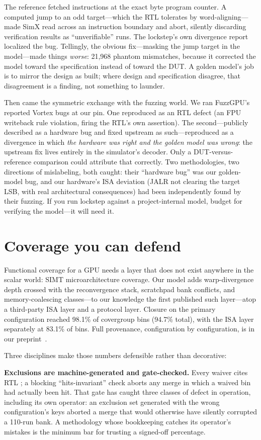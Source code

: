 \documentclass[conference]{IEEEtran}
\newcommand{\code}[1]{\texttt{\detokenize{#1}}}
\begin{document}
The reference fetched instructions at the exact byte program counter.
A computed jump to an odd target---which the RTL tolerates by
word-aligning---made SimX read across an instruction boundary and
abort, silently discarding verification results as ``unverifiable''
runs. The lockstep's own divergence report localized the bug.
Tellingly, the obvious fix---masking the jump target in the
model---made things \emph{worse}: 21{,}968 phantom mismatches,
because it corrected the model toward the specification instead of
toward the DUT. A golden model's job is to mirror the design as
built; where design and specification disagree, that disagreement is
a finding, not something to launder.

Then came the symmetric exchange with the fuzzing world. We ran
FuzzGPU's reported Vortex bugs at our pin. One reproduced as an RTL
defect (an FPU writeback rule violation, firing the RTL's own
assertion). The second---publicly described as a hardware bug and
fixed upstream as such---reproduced as a divergence in which
\emph{the hardware was right and the golden model was wrong}: the
upstream fix lives entirely in the simulator's decoder. Only a
DUT-versus-reference comparison could attribute that correctly. Two
methodologies, two directions of mislabeling, both caught: their
``hardware bug'' was our golden-model bug, and our hardware's ISA
deviation (JALR not clearing the target LSB, with real architectural
consequences) had been independently found by their fuzzing. If you
run lockstep against a project-internal model, budget for verifying
the model---it will need it.

\section{Coverage you can defend}
Functional coverage for a GPU needs a layer that does not exist
anywhere in the scalar world: SIMT microarchitecture coverage. Our
model adds warp-divergence depth crossed with the reconvergence
stack, scratchpad bank conflicts, and memory-coalescing
classes---to our knowledge the first published such layer---atop a
third-party ISA layer and a protocol layer. Closure on the primary
configuration reached 98.1\% of covergroup bins (94.7\% total), with
the ISA layer separately at 83.1\% of bins. Full provenance,
configuration by configuration, is in our preprint~\cite{preprint}.

Three disciplines make those numbers defensible rather than
decorative:

\textbf{Exclusions are machine-generated and gate-checked.} Every
waiver cites RTL \code{file:line}; a blocking ``hits-invariant''
check aborts any merge in which a waived bin had actually been hit.
That gate has caught three classes of defect in operation, including
its own operator: an exclusion set generated with the wrong
configuration's keys aborted a merge that would otherwise have
silently corrupted a 110-run bank. A methodology whose bookkeeping
catches its operator's mistakes is the minimum bar for trusting a
signed-off percentage.
\end{document}
